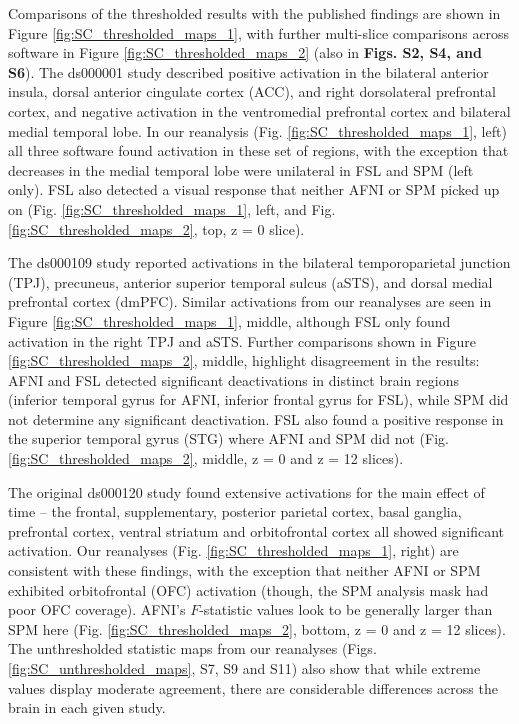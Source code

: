 Comparisons of the thresholded results with the published findings are shown in Figure \ref{fig:SC_thresholded_maps_1}, with further multi-slice comparisons across software in Figure \ref{fig:SC_thresholded_maps_2} (also in \textbf{Figs. S2, S4, and S6}). The ds000001 study described positive activation in the bilateral anterior insula, dorsal anterior cingulate cortex (ACC), and right dorsolateral prefrontal cortex, and negative activation in the ventromedial prefrontal cortex and bilateral medial temporal lobe. In our reanalysis (Fig.  \ref{fig:SC_thresholded_maps_1}, left) all three software found activation in these set of regions, with the exception that decreases in the medial temporal lobe were unilateral in FSL and SPM (left only). FSL also detected a visual response that neither AFNI or SPM picked up on (Fig.  \ref{fig:SC_thresholded_maps_1},  left, and Fig.  \ref{fig:SC_thresholded_maps_2}, top, z = 0 slice).

The ds000109 study reported activations in the bilateral temporoparietal junction (TPJ), precuneus, anterior superior temporal sulcus (aSTS), and dorsal medial prefrontal cortex (dmPFC). Similar activations from our reanalyses are seen in Figure \ref{fig:SC_thresholded_maps_1}, middle, although FSL only found activation in the right TPJ and aSTS. Further comparisons shown in Figure \ref{fig:SC_thresholded_maps_2}, middle, highlight disagreement in the results: AFNI and FSL detected significant deactivations in distinct brain regions (inferior temporal gyrus for AFNI, inferior frontal gyrus for FSL), while SPM did not determine any significant deactivation. FSL also found a positive response in the superior temporal gyrus  (STG) where AFNI and SPM did not (Fig. \ref{fig:SC_thresholded_maps_2}, middle, z = 0 and z = 12 slices).

The original ds000120 study found extensive activations for the main effect of time -- the frontal, supplementary, posterior parietal cortex, basal ganglia, prefrontal cortex, ventral striatum and orbitofrontal cortex all showed significant activation. Our reanalyses (Fig. \ref{fig:SC_thresholded_maps_1}, right) are consistent with these findings, with the exception that neither AFNI or SPM exhibited orbitofrontal (OFC) activation (though, the SPM  analysis mask had poor OFC coverage). AFNI's $F$-statistic values look to be generally larger than SPM here (Fig. \ref{fig:SC_thresholded_maps_2}, bottom, z = 0 and z = 12 slices). The unthresholded statistic maps from our reanalyses (Figs. \ref{fig:SC_unthresholded_maps}, S7, S9 and S11) also show that while extreme values display moderate agreement, there are considerable differences across the brain in each given study.

